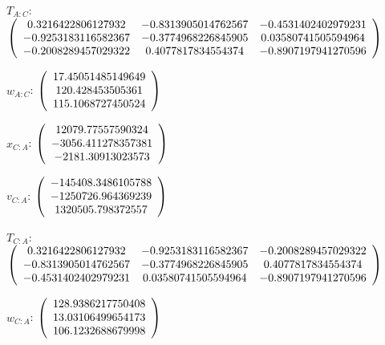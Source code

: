\begin{description}
$T_{A:C}$: $\left( \begin{array} {ccc}
 0.3216422806127932 &   -0.8313905014762567 &   -0.4531402402979231 \\
  -0.9253183116582367 &   -0.3774968226845905 &   0.03580741505594964 \\
   -0.2008289457029322 &    0.4077817834554374 &   -0.8907197941270596 \\
\end{array} \right)\\ \\$

$w_{A:C}$:  $\left( \begin{array} {ccc}  17.45051485149649 \\      120.428453505361 \\     115.1068727450524
\end{array} \right)\\ \\$

$x_{C:A}$: $\left( \begin{array} {ccc} 12079.77557590324 \\    -3056.411278357381 \\     -2181.30913023573
\end{array} \right)\\ \\$

$v_{C:A}$:  $\left( \begin{array} {ccc}  -145408.3486105788 \\    -1250726.964369239 \\     1320505.798372557
\end{array} \right)\\ \\$

$T_{C:A}$: $\left( \begin{array} {ccc}
0.3216422806127932 &   -0.9253183116582367 &   -0.2008289457029322 \\
 -0.8313905014762567 &   -0.3774968226845905 &    0.4077817834554374 \\
  -0.4531402402979231 &   0.03580741505594964 &   -0.8907197941270596 \\
\end{array} \right)\\ \\$

$w_{C:A}$:  $\left( \begin{array} {ccc}
 128.9386217750408 \\     13.03106499654173 \\     106.1232688679998
\end{array} \right)\\ \\$



\end{description}
